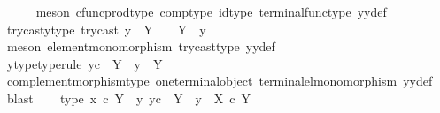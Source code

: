 \begin{isabellebody}
\ \ \ \ \isamarkupfalse%
\ {\isacharparenleft}{\kern0pt}meson\ cfunc{\isacharunderscore}{\kern0pt}prod{\isacharunderscore}{\kern0pt}type\ comp{\isacharunderscore}{\kern0pt}type\ id{\isacharunderscore}{\kern0pt}type\ terminal{\isacharunderscore}{\kern0pt}func{\isacharunderscore}{\kern0pt}type\ y{}y{}{\isacharunderscore}{\kern0pt}def{\isacharparenright}{\kern0pt}\isanewline
\ \ \isamarkupfalse%
\ trycast{\isacharunderscore}{\kern0pt}y{}{\isacharunderscore}{\kern0pt}type{\isacharcolon}{\kern0pt}\ {\isachardoublequoteopen}try{\isacharunderscore}{\kern0pt}cast\ y{}\ {\isacharcolon}{\kern0pt}\ Y\ {\isasymrightarrow}\ {\isasymone}\ {\isasymCoprod}\ {\isacharparenleft}{\kern0pt}Y\ {\isasymsetminus}\ {\isacharparenleft}{\kern0pt}{\isasymone}{\isacharcomma}{\kern0pt}y{}{\isacharparenright}{\kern0pt}{\isacharparenright}{\kern0pt}{\isachardoublequoteclose}\isanewline
\ \ \ \ \isamarkupfalse%
\ {\isacharparenleft}{\kern0pt}meson\ element{\isacharunderscore}{\kern0pt}monomorphism\ try{\isacharunderscore}{\kern0pt}cast{\isacharunderscore}{\kern0pt}type\ y{}y{}{\isacharunderscore}{\kern0pt}def{\isacharparenright}{\kern0pt}\isanewline
\ \ \isamarkupfalse%
\ y{}{\isacharprime}{\kern0pt}{\isacharunderscore}{\kern0pt}type{\isacharbrackleft}{\kern0pt}type{\isacharunderscore}{\kern0pt}rule{\isacharbrackright}{\kern0pt}{\isacharcolon}{\kern0pt}\ {\isachardoublequoteopen}y{}\isactrlsup c\ {\isacharcolon}{\kern0pt}\ Y\ {\isasymsetminus}\ {\isacharparenleft}{\kern0pt}{\isasymone}{\isacharcomma}{\kern0pt}y{}{\isacharparenright}{\kern0pt}\ {\isasymrightarrow}\ Y{\isachardoublequoteclose}\isanewline
\ \ \ \ \isamarkupfalse%
\ complement{\isacharunderscore}{\kern0pt}morphism{\isacharunderscore}{\kern0pt}type\ one{\isacharunderscore}{\kern0pt}terminal{\isacharunderscore}{\kern0pt}object\ terminal{\isacharunderscore}{\kern0pt}el{\isacharunderscore}{\kern0pt}monomorphism\ y{}y{}{\isacharunderscore}{\kern0pt}def\ \isamarkupfalse%
\ blast\isanewline
\ \ \isamarkupfalse%
\ type{}{\isacharcolon}{\kern0pt}\ {\isachardoublequoteopen}{\isasymlangle}x{}\ {\isasymcirc}\isactrlsub c\ {\isasymbeta}\isactrlbsub Y\ {\isasymsetminus}\ {\isacharparenleft}{\kern0pt}{\isasymone}{\isacharcomma}{\kern0pt}y{}{\isacharparenright}{\kern0pt}\isactrlesub {\isacharcomma}{\kern0pt}\ y{}\isactrlsup c{\isasymrangle}\ {\isacharcolon}{\kern0pt}\ Y\ {\isasymsetminus}\ {\isacharparenleft}{\kern0pt}{\isasymone}{\isacharcomma}{\kern0pt}y{}{\isacharparenright}{\kern0pt}\ {\isasymrightarrow}\ {\isacharparenleft}{\kern0pt}X\ {\isasymtimes}\isactrlsub c\ Y{\isacharparenright}{\kern0pt}{\isachardoublequoteclose}\isanewline

\end{isabellebody}
